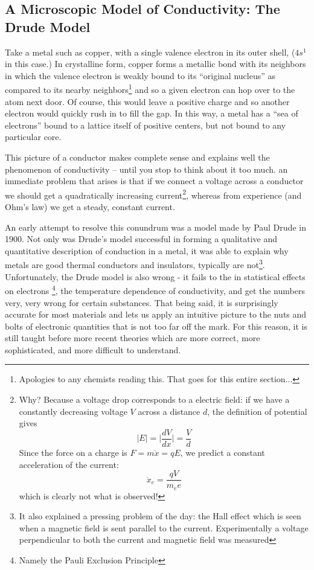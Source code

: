 \documentclass{tufte-book}
\begin{document}
\subsection{A Microscopic Model of Conductivity: The Drude Model}

Take a metal such as copper, with a single valence electron in its outer shell, ($4s^1$ in this case.) In crystalline form, copper forms a metallic bond with its neighbors in which the valence electron is weakly bound to its ``original nucleus'' as compared to its nearby neighbors\footnote{ Apologies to any chemists reading this. That goes for this entire section...} and so a given electron can hop over to the atom next door. Of course, this would leave a positive charge and so another electron would quickly rush in to fill the gap. In this way, a metal has a ``sea of electrons'' bound to a lattice itself of positive centers, but not bound to any particular core. 

This picture of a conductor makes complete sense and explains well the phenomenon of conductivity -- until you stop to think about it too much. an immediate problem that arises is that if we connect a voltage across a conductor we should get a quadratically increasing current\footnote{Why? Because a voltage drop corresponds to a electric field: if we have a constantly decreasing voltage $V$ across a distance $d$, the definition of potential gives 
$$\vert E \vert = \vert\frac{dV}{dx}\vert = \frac{V}{d}$$ 
Since the force on a charge is $F = m\ddot{x} = qE$, we predict a constant acceleration of the current:
$$
\ddot{x}_e = \frac{qV}{m_ee}
$$
which is clearly not what is observed!}, whereas from experience (and Ohm's law) we get a steady, constant current.

An early attempt to resolve this conundrum was a model made by Paul Drude in 1900. Not only was Drude's model successful in forming a qualitative and quantitative description of conduction in a metal, it was able to explain why metals are good thermal conductors and insulators, typically are not\footnote{It also explained a pressing problem of the day: the Hall effect which is seen when a magnetic field is sent parallel to the current. Experimentally a voltage perpendicular to both the current and magnetic field was measured}. Unfortunately, the Drude model is also wrong - it fails to the in statistical effects on electrons \footnote{Namely the Pauli Exclusion Principle}, the temperature dependence of conductivity, and get the numbers very, very wrong for certain substances. That being said, it is surprisingly accurate for most materials and lets us apply an intuitive picture to the nuts and bolts of electronic quantities that is not too far off the mark. For this reason, it is still taught before more recent theories which are more correct, more sophisticated, and more difficult to understand. 
\end{document}
